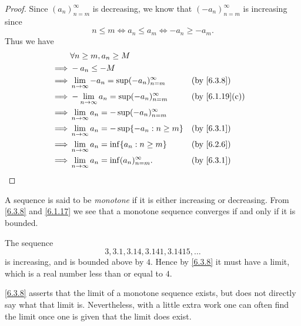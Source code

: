 \begin{proof}
  Since \((a_n)_{n = m}^\infty\) is decreasing, we know that \((-a_n)_{n = m}^\infty\) is increasing since
  \[
    n \leq m \iff a_n \leq a_m \iff -a_n \geq -a_m.
  \]
  Thus we have
  \begin{align*}
             & \forall n \geq m, a_n \geq M                                                           \\
    \implies & -a_n \leq -M                                                                           \\
    \implies & \lim_{n \to \infty} -a_n = \sup(-a_n)_{n = m}^\infty &  & \text{(by \cref{6.3.8})}     \\
    \implies & -\lim_{n \to \infty} a_n = \sup(-a_n)_{n = m}^\infty &  & \text{(by \cref{6.1.19}(c))} \\
    \implies & \lim_{n \to \infty} a_n = -\sup(-a_n)_{n = m}^\infty                                   \\
    \implies & \lim_{n \to \infty} a_n = -\sup\{-a_n : n \geq m\}   &  & \text{(by \cref{6.3.1})}     \\
    \implies & \lim_{n \to \infty} a_n = \inf\{a_n : n \geq m\}     &  & \text{(by \cref{6.2.6})}     \\
    \implies & \lim_{n \to \infty} a_n = \inf(a_n)_{n = m}^\infty.  &  & \text{(by \cref{6.3.1})}
  \end{align*}
\end{proof}

\begin{note}
  A sequence is said to be \emph{monotone} if it is either increasing or decreasing.
  From \cref{6.3.8} and \cref{6.1.17} we see that a monotone sequence converges if and only if it is bounded.
\end{note}

\begin{eg}\label{6.3.9}
  The sequence
  \[
    3, 3.1, 3.14, 3.141, 3.1415, \dots
  \]
  is increasing, and is bounded above by \(4\).
  Hence by \cref{6.3.8} it must have a limit, which is a real number less than or equal to \(4\).
\end{eg}

\begin{note}
  \cref{6.3.8} asserts that the limit of a monotone sequence exists, but does not directly say what that limit is.
  Nevertheless, with a little extra work one can often find the limit once one is given that the limit does exist.
\end{note}

